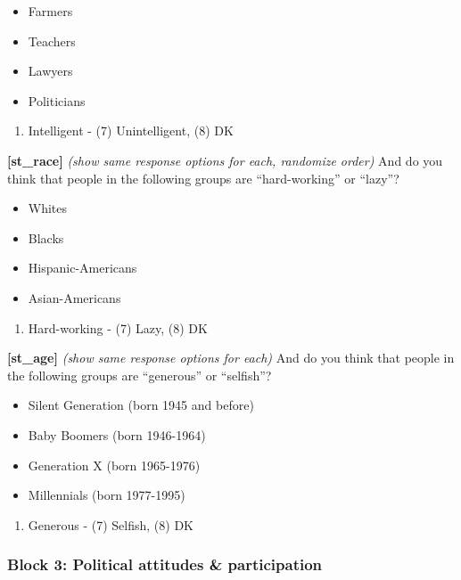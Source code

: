 \documentclass[
]{article}
\providecommand{\tightlist}{%
  \setlength{\itemsep}{0pt}\setlength{\parskip}{0pt}}
\begin{document}
\begin{itemize}
\tightlist
\item
  Farmers
\item
  Teachers
\item
  Lawyers
\item
  Politicians
\end{itemize}

\begin{enumerate}
\def\labelenumi{(\arabic{enumi})}
\tightlist
\item
  Intelligent - (7) Unintelligent, (8) DK
\end{enumerate}

\textbf{{[}st\_race{]}} \emph{(show same response options for each,
randomize order)} And do you think that people in the following groups
are ``hard-working'' or ``lazy''?

\begin{itemize}
\tightlist
\item
  Whites
\item
  Blacks
\item
  Hispanic-Americans
\item
  Asian-Americans
\end{itemize}

\begin{enumerate}
\def\labelenumi{(\arabic{enumi})}
\tightlist
\item
  Hard-working - (7) Lazy, (8) DK
\end{enumerate}

\textbf{{[}st\_age{]}} \emph{(show same response options for each)} And
do you think that people in the following groups are ``generous'' or
``selfish''?

\begin{itemize}
\tightlist
\item
  Silent Generation (born 1945 and before)
\item
  Baby Boomers (born 1946-1964)
\item
  Generation X (born 1965-1976)
\item
  Millennials (born 1977-1995)
\end{itemize}

\begin{enumerate}
\def\labelenumi{(\arabic{enumi})}
\tightlist
\item
  Generous - (7) Selfish, (8) DK
\end{enumerate}

\hypertarget{block-3-political-attitudes-participation}{%
\subsubsection{Block 3: Political attitudes \&
participation}\label{block-3-political-attitudes-participation}}
\end{document}
